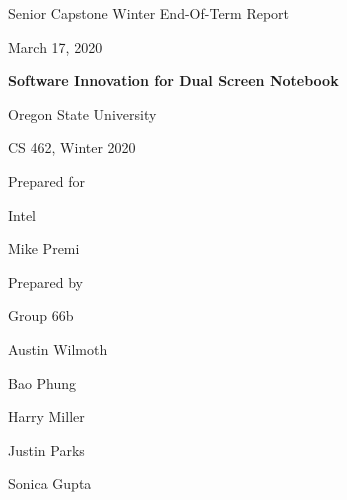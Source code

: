 \documentclass[fullpage, 10pt, onecolumn, draftclsnofoot]{IEEEtran}
\def \CapstoneTeamName{WE SHOULD HAVE A TEAM NAME???}
\def \CapstoneTeamNumber{		66b}
\def \GroupMemberOne{			Austin Wilmoth}
\def \GroupMemberTwo{			Bao Phung}
\def \GroupMemberThree{			Harry Miller}
\def \GroupMemberFour{			Justin Parks}
\def \GroupMemberFive{			Sonica Gupta}
\def \CapstoneProjectName{		Software Innovation for  Dual Screen Notebook}
\def \CapstoneSponsorCompany{	Intel}
\def \CapstoneSponsorPerson{		Mike Premi}
\def \DocType{		%
				Winter End-Of-Term Report
				}
\newcommand{\NameSigPair}[1]{\par
\makebox[2.75in][r]{#1} \hfil 	\makebox[3.25in]{\makebox[2.25in]{\hrulefill} \hfill		\makebox[.75in]{\hrulefill}}
\par\vspace{-12pt} \textit{\tiny\noindent
\makebox[2.75in]{} \hfil		\makebox[3.25in]{\makebox[2.25in][r]{Signature} \hfill	\makebox[.75in][r]{Date}}}}
\renewcommand{\NameSigPair}[1]{#1}
\begin{document}
\begin{titlepage}
    \begin{singlespace}
        \hfill 
        \par\vspace{.2in}
        \centering
        \scshape{
            \huge Senior Capstone \DocType \par
            {\large March 17, 2020}\par
            \vspace{.5in}
            \textbf{\Huge\CapstoneProjectName}\par
            \vfill
            \huge Oregon State University \par
            \huge CS 462, Winter 2020 \par
            \vspace{.5in}
            {\large Prepared for}\par
            \Huge \CapstoneSponsorCompany\par
            \vspace{5pt}
            {\Large\NameSigPair{\CapstoneSponsorPerson}\par}
            {\large Prepared by }\par
            Group\CapstoneTeamNumber\par
            \vspace{5pt}
            {\Large
                \NameSigPair{\GroupMemberOne}\par
                \NameSigPair{\GroupMemberTwo}\par
                \NameSigPair{\GroupMemberThree}\par
                \NameSigPair{\GroupMemberFour}\par
                \NameSigPair{\GroupMemberFive}\par
            }
            \vspace{20pt}
        }
        \begin{abstract}




\end{abstract}
\end{singlespace}
\end{titlepage}
\end{document}
